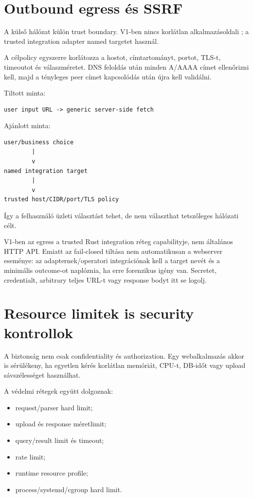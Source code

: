 \section{Outbound egress és SSRF}

A külső hálózat külön trust boundary. V1-ben nincs korlátlan alkalmazásoldali ; a trusted integration adapter named targetet használ.

A célpolicy egyszerre korlátozza a hostot, címtartományt, portot, TLS-t, timeoutot és válaszméretet. DNS feloldás után minden A/AAAA címet ellenőrizni kell, majd a tényleges peer címet kapcsolódás után újra kell validálni.

Tiltott minta:

\begin{lstlisting}
user input URL -> generic server-side fetch
\end{lstlisting}

Ajánlott minta:

\begin{lstlisting}
user/business choice
        |
        v
named integration target
        |
        v
trusted host/CIDR/port/TLS policy
\end{lstlisting}

Így a felhasználó üzleti választást tehet, de nem választhat tetszőleges hálózati célt.

V1-ben az egress a trusted Rust integration réteg capabilityje, nem általános  HTTP API. Emiatt az  fail-closed tiltása nem automatikusan a webserver  eseménye: az adapternek/operatori integrációnak kell a target nevét és a minimális outcome-ot naplóznia, ha erre forenzikus igény van. Secretet, credentialt, arbitrary teljes URL-t vagy response bodyt itt se logolj.

\section{Resource limitek is security kontrollok}

A biztonság nem csak confidentiality és authorization. Egy webalkalmazás akkor is sérülékeny, ha egyetlen kérés korlátlan memóriát, CPU-t, DB-időt vagy upload sávszélességet használhat.

A védelmi rétegek együtt dolgoznak:

\begin{itemize}
  \item request/parser hard limit;
  \item upload és response méretlimit;
  \item query/result limit és timeout;
  \item rate limit;
  \item runtime resource profile;
  \item process/systemd/cgroup hard limit.
\end{itemize}

